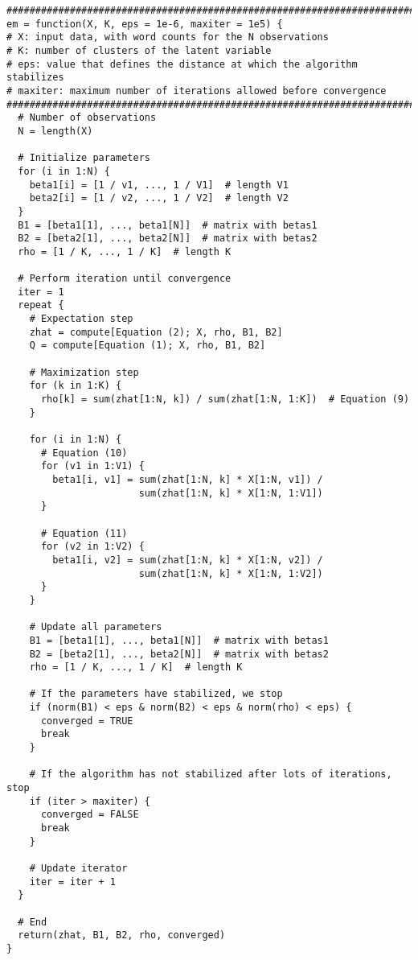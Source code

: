 \documentclass[a4paper, 11pt]{article}
\begin{document}
\begin{verbatim}
################################################################################
em = function(X, K, eps = 1e-6, maxiter = 1e5) {
# X: input data, with word counts for the N observations
# K: number of clusters of the latent variable
# eps: value that defines the distance at which the algorithm stabilizes
# maxiter: maximum number of iterations allowed before convergence
################################################################################  
  # Number of observations
  N = length(X)

  # Initialize parameters
  for (i in 1:N) {
    beta1[i] = [1 / v1, ..., 1 / V1]  # length V1
    beta2[i] = [1 / v2, ..., 1 / V2]  # length V2
  }
  B1 = [beta1[1], ..., beta1[N]]  # matrix with betas1
  B2 = [beta2[1], ..., beta2[N]]  # matrix with betas2
  rho = [1 / K, ..., 1 / K]  # length K

  # Perform iteration until convergence
  iter = 1
  repeat {
    # Expectation step
    zhat = compute[Equation (2); X, rho, B1, B2]
    Q = compute[Equation (1); X, rho, B1, B2]

    # Maximization step
    for (k in 1:K) {
      rho[k] = sum(zhat[1:N, k]) / sum(zhat[1:N, 1:K])  # Equation (9)
    }

    for (i in 1:N) {
      # Equation (10)
      for (v1 in 1:V1) {
        beta1[i, v1] = sum(zhat[1:N, k] * X[1:N, v1]) /
                       sum(zhat[1:N, k] * X[1:N, 1:V1])
      }

      # Equation (11)
      for (v2 in 1:V2) {
        beta1[i, v2] = sum(zhat[1:N, k] * X[1:N, v2]) /
                       sum(zhat[1:N, k] * X[1:N, 1:V2])
      }
    }

    # Update all parameters
    B1 = [beta1[1], ..., beta1[N]]  # matrix with betas1
    B2 = [beta2[1], ..., beta2[N]]  # matrix with betas2
    rho = [1 / K, ..., 1 / K]  # length K

    # If the parameters have stabilized, we stop
    if (norm(B1) < eps & norm(B2) < eps & norm(rho) < eps) {
      converged = TRUE
      break
    }

    # If the algorithm has not stabilized after lots of iterations, stop
    if (iter > maxiter) {
      converged = FALSE
      break
    }

    # Update iterator
    iter = iter + 1
  }

  # End
  return(zhat, B1, B2, rho, converged)
}
\end{verbatim}
\end{document}
